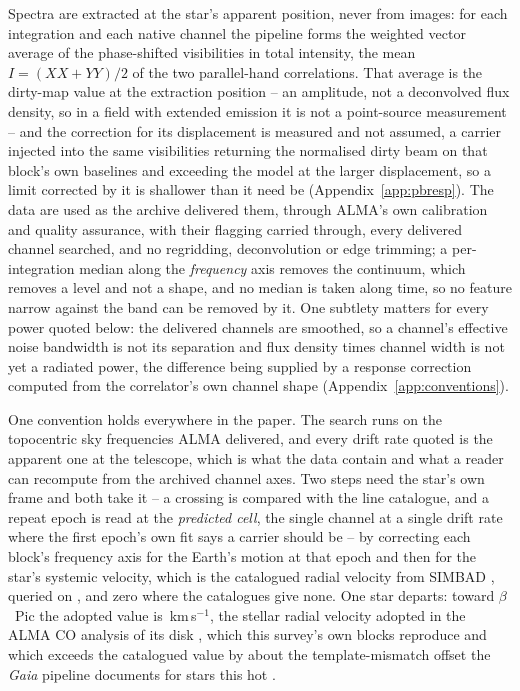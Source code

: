 Spectra are extracted at the star's apparent position, never from images: for
each integration and each native channel the pipeline forms the weighted vector
average of the phase-shifted visibilities in total intensity, the mean
$I=(XX+YY)/2$ of the two parallel-hand correlations. That average is the
dirty-map value at the extraction position -- an amplitude, not a deconvolved
flux density, so in a field with extended emission it is not a point-source
measurement -- and the correction for its displacement is measured and not
assumed, a carrier injected into the same visibilities returning the normalised
dirty beam on that block's own baselines and exceeding the model at the larger
displacement, so a limit corrected by it is shallower than it need be
(Appendix~\ref{app:pbresp}). The data are used as the archive delivered them,
through ALMA's own calibration and quality assurance, with their flagging
carried through, every delivered channel searched, and no regridding,
deconvolution or edge trimming; a per-integration median along the
\emph{frequency} axis removes the continuum, which removes a level and not a
shape, and no median is taken along time, so no feature narrow against the band
can be removed by it. One subtlety matters for every power quoted below: the
delivered channels are smoothed, so a channel's effective noise bandwidth is
not its separation and flux density times channel width is not yet a radiated
power, the difference being supplied by a response correction computed from the
correlator's own channel shape (Appendix~\ref{app:conventions}).

One convention holds everywhere in the paper. The search runs on the
topocentric sky frequencies ALMA delivered, and every drift rate quoted is the
apparent one at the telescope, which is what the data contain and what a reader
can recompute from the archived channel axes. Two steps need the star's own
frame and both take it -- a crossing is compared with the line catalogue, and a
repeat epoch is read at the \emph{predicted cell}, the single channel at a
single drift rate where the first epoch's own fit says a carrier should be --
by correcting each block's frequency axis for the Earth's motion at that epoch
and then for the star's systemic velocity, which is the catalogued radial
velocity from SIMBAD \citep{SIMBAD2000}, queried on \SimbadQueryDate, and zero
where the catalogues give none. One star departs: toward $\beta$~Pic the
adopted value is \BpRecVsys\,km\,s$^{-1}$, the stellar radial velocity adopted
in the ALMA CO analysis of its disk \citep{Matra2017}, which this survey's own
blocks reproduce and which exceeds the catalogued value by about the
template-mismatch offset the \textit{Gaia} pipeline documents for stars this
hot \citep{Blomme2023}.

